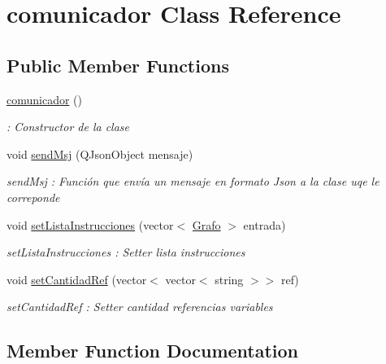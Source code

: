 \hypertarget{classcomunicador}{}\section{comunicador Class Reference}
\label{classcomunicador}
\subsection*{Public Member Functions}
\begin{DoxyCompactItemize}
\item 
\hyperlink{classcomunicador_a005f11d1ede5b85ee287978579f80218}{comunicador} ()\hypertarget{classcomunicador_a005f11d1ede5b85ee287978579f80218}{}\label{classcomunicador_a005f11d1ede5b85ee287978579f80218}

\begin{DoxyCompactList}\small\item\em \+: Constructor de la clase \end{DoxyCompactList}\item 
void \hyperlink{classcomunicador_a3613c2e2ae0f26843d867551291c5a20}{send\+Msj} (Q\+Json\+Object mensaje)
\begin{DoxyCompactList}\small\item\em send\+Msj \+: Función que envía un mensaje en formato Json a la clase uqe le correponde \end{DoxyCompactList}\item 
void \hyperlink{classcomunicador_a19b421cd07531b5366b213298262caca}{set\+Lista\+Instrucciones} (vector$<$ \hyperlink{class_grafo}{Grafo} $>$ entrada)
\begin{DoxyCompactList}\small\item\em set\+Lista\+Instrucciones \+: Setter lista instrucciones \end{DoxyCompactList}\item 
void \hyperlink{classcomunicador_abec00a1e578d993b646b91951eca9e9f}{set\+Cantidad\+Ref} (vector$<$ vector$<$ string $>$$>$ ref)
\begin{DoxyCompactList}\small\item\em set\+Cantidad\+Ref \+: Setter cantidad referencias variables \end{DoxyCompactList}\end{DoxyCompactItemize}


\subsection{Member Function Documentation}
